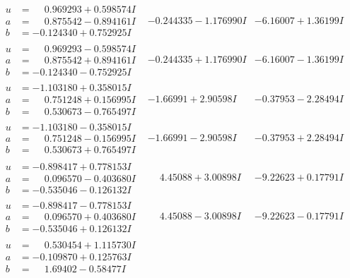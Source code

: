 \documentclass[1p]{elsarticle_modified}
\theoremstyle{definition}
\begin{document}
$$\begin{array}{c|c|c}
\begin{aligned}
u &= \phantom{-}0.969293 + 0.598574 I \\
a &= \phantom{-}0.875542 - 0.894161 I \\
b &= -0.124340 + 0.752925 I\end{aligned}
 & -0.244335 - 1.176990 I & -6.16007 + 1.36199 I \\ \hline\begin{aligned}
u &= \phantom{-}0.969293 - 0.598574 I \\
a &= \phantom{-}0.875542 + 0.894161 I \\
b &= -0.124340 - 0.752925 I\end{aligned}
 & -0.244335 + 1.176990 I & -6.16007 - 1.36199 I \\ \hline\begin{aligned}
u &= -1.103180 + 0.358015 I \\
a &= \phantom{-}0.751248 + 0.156995 I \\
b &= \phantom{-}0.530673 - 0.765497 I\end{aligned}
 & -1.66991 + 2.90598 I & -0.37953 - 2.28494 I \\ \hline\begin{aligned}
u &= -1.103180 - 0.358015 I \\
a &= \phantom{-}0.751248 - 0.156995 I \\
b &= \phantom{-}0.530673 + 0.765497 I\end{aligned}
 & -1.66991 - 2.90598 I & -0.37953 + 2.28494 I \\ \hline\begin{aligned}
u &= -0.898417 + 0.778153 I \\
a &= \phantom{-}0.096570 - 0.403680 I \\
b &= -0.535046 - 0.126132 I\end{aligned}
 & \phantom{-}4.45088 + 3.00898 I & -9.22623 + 0.17791 I \\ \hline\begin{aligned}
u &= -0.898417 - 0.778153 I \\
a &= \phantom{-}0.096570 + 0.403680 I \\
b &= -0.535046 + 0.126132 I\end{aligned}
 & \phantom{-}4.45088 - 3.00898 I & -9.22623 - 0.17791 I \\ \hline\begin{aligned}
u &= \phantom{-}0.530454 + 1.115730 I \\
a &= -0.109870 + 0.125763 I \\
b &= \phantom{-}1.69402 - 0.58477 I\end{aligned}

\end{array}$$
\end{document}
